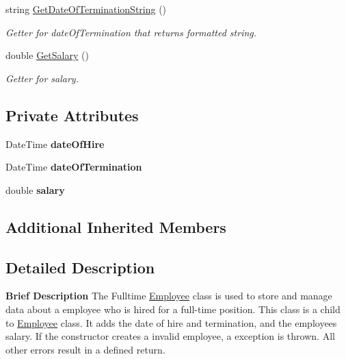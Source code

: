 \begin{DoxyCompactItemize}
string \hyperlink{class_all_employees_1_1_fulltime_employee_a7d0612eba21e83226bb09a174179847c}{Get\+Date\+Of\+Termination\+String} ()
\begin{DoxyCompactList}\small\item\em Getter for date\+Of\+Termination that returns formatted string. \end{DoxyCompactList}\item 
double \hyperlink{class_all_employees_1_1_fulltime_employee_aad38dced5f64bb3ea0bb6f474547370e}{Get\+Salary} ()
\begin{DoxyCompactList}\small\item\em Getter for salary. \end{DoxyCompactList}\end{DoxyCompactItemize}
\subsection*{Private Attributes}
\begin{DoxyCompactItemize}
\item 
\hypertarget{class_all_employees_1_1_fulltime_employee_aa072bd7c652567684c77e0cfd6638af2}{}Date\+Time {\bfseries date\+Of\+Hire}\label{class_all_employees_1_1_fulltime_employee_aa072bd7c652567684c77e0cfd6638af2}

\item 
\hypertarget{class_all_employees_1_1_fulltime_employee_a3836c1a3f74f71f87652c91913eb570c}{}Date\+Time {\bfseries date\+Of\+Termination}\label{class_all_employees_1_1_fulltime_employee_a3836c1a3f74f71f87652c91913eb570c}

\item 
\hypertarget{class_all_employees_1_1_fulltime_employee_ad52581c3ee723884cc6b34111cac53b7}{}double {\bfseries salary}\label{class_all_employees_1_1_fulltime_employee_ad52581c3ee723884cc6b34111cac53b7}

\end{DoxyCompactItemize}
\subsection*{Additional Inherited Members}


\subsection{Detailed Description}
{\bfseries Brief Description} The Fulltime \hyperlink{class_all_employees_1_1_employee}{Employee} class is used to store and manage data about a employee who is hired for a full-\/time position. This class is a child to \hyperlink{class_all_employees_1_1_employee}{Employee} class. It adds the date of hire and termination, and the employees salary. If the constructor creates a invalid employee, a exception is thrown. All other errors result in a defined return. 

